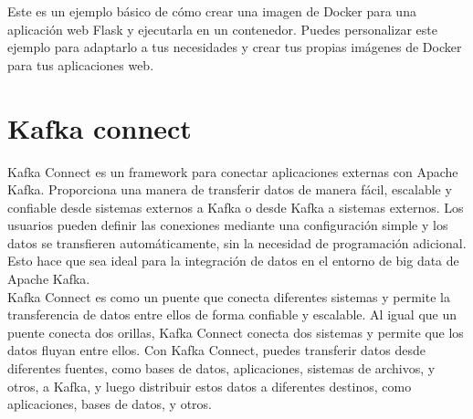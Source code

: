\documentclass{article}
\begin{document}
Este es un ejemplo básico de cómo crear una imagen de Docker para una aplicación web Flask y ejecutarla en un contenedor. Puedes personalizar este ejemplo para adaptarlo a tus necesidades y crear tus propias imágenes de Docker para tus aplicaciones web.
\newpage
\section{Kafka connect}
Kafka Connect es un framework para conectar aplicaciones externas con Apache Kafka. Proporciona una manera de transferir datos de manera fácil, escalable y confiable desde sistemas externos a Kafka o desde Kafka a sistemas externos. Los usuarios pueden definir las conexiones mediante una configuración simple y los datos se transfieren automáticamente, sin la necesidad de programación adicional. Esto hace que sea ideal para la integración de datos en el entorno de big data de Apache Kafka.\\

Kafka Connect es como un puente que conecta diferentes sistemas y permite la transferencia de datos entre ellos de forma confiable y escalable. Al igual que un puente conecta dos orillas, Kafka Connect conecta dos sistemas y permite que los datos fluyan entre ellos. Con Kafka Connect, puedes transferir datos desde diferentes fuentes, como bases de datos, aplicaciones, sistemas de archivos, y otros, a Kafka, y luego distribuir estos datos a diferentes destinos, como aplicaciones, bases de datos, y otros.
\end{document}
